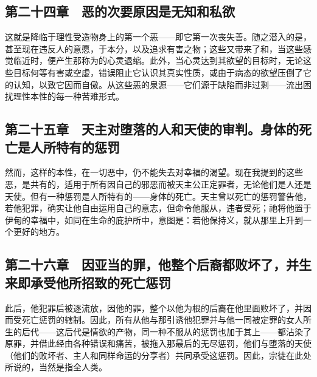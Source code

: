 \subsection{第二十四章　恶的次要原因是无知和私欲}

这就是降临于理性受造物身上的第一个恶——即它第一次丧失善。随之潜入的是，甚至现在违反人的意愿，\newline{}于本分，以及追求有害之物；这些又带来了和，当这些感觉临近时，便产生那称为的心灵退缩。此外，当心灵达到其欲望的目标时，无论这些目标何等有害或空虚，错误阻止它认识其真实性质，或由于病态的欲望压倒了它的认知，以致它因而自傲。从这些恶的泉源——它们源于缺陷而非过剩——流出困扰理性本性的每一种苦难形式。\par


\subsection{第二十五章　天主对堕落的人和天使的审判。身体的死亡是人所特有的惩罚}

然而，这样的本性，在一切恶中，仍不能失去对幸福的渴望。现在我提到的这些恶，是共有的，适用于所有因自己的邪恶而被天主公正定罪者，无论他们是人还是天使。但有一种惩罚是人所特有的——身体的死亡。天主曾以死亡的惩罚警告他，若他犯罪，确实让他自由运用自己的意志，但命令他服从，违者受死；祂将他置于伊甸的幸福中，如同在生命的庇护所中，意图是：若他保持义，就从那里上升到一个更好的地方。\par


\subsection{第二十六章　因亚当的罪，他整个后裔都败坏了，并生来即承受他所招致的死亡惩罚}

此后，他犯罪后被逐流放，因他的罪，整个以他为根的后裔在他里面败坏了，并因而受死亡惩罚的辖制。因此，所有从他与那引诱他犯罪并与他一同被定罪的女人所生的后代——这后代是情欲的产物，同一种不服从的惩罚也加于其上——都沾染了原罪，并借此经由各种错误和痛苦，被拖入那最后的无尽惩罚，他们与堕落的天使（他们的败坏者、主人和同样命运的分享者）共同承受这惩罚。因此，\newline{}宗徒在此处所说的，当然是指全人类。\par


